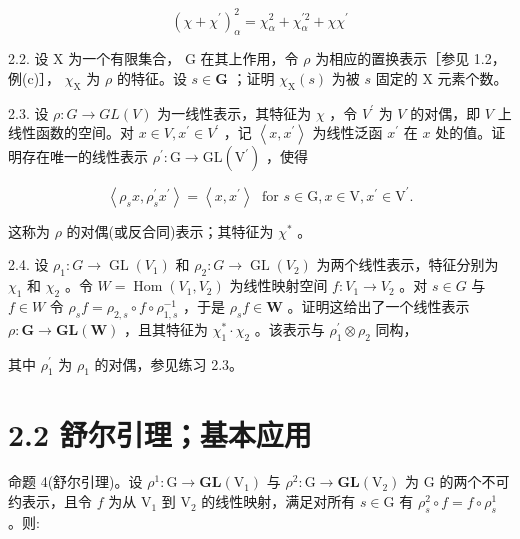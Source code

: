 \documentclass[10pt]{article}
\begin{document}
\[
{\left( \chi  + {\chi }^{\prime }\right) }_{\alpha }^{2} = {\chi }_{\alpha }^{2} + {\chi }_{\alpha }^{\prime 2} + \chi {\chi }^{\prime }
\]

2.2. 设 \(\mathrm{X}\) 为一个有限集合， \(\mathrm{G}\) 在其上作用，令 \(\rho\) 为相应的置换表示［参见 1.2，例(c)］， \({\chi }_{\mathrm{X}}\) 为 \(\rho\) 的特征。设 \(s \in  \mathbf{G}\) ；证明 \({\chi }_{\mathrm{X}}\left( s\right)\) 为被 \(s\) 固定的 \(\mathrm{X}\) 元素个数。

2.3. 设 \(\rho  : G \rightarrow  {GL}\left( V\right)\) 为一线性表示，其特征为 \(\chi\) ，令 \({V}^{\prime }\) 为 \(V\) 的对偶，即 \(V\) 上线性函数的空间。对 \(x \in  V,{x}^{\prime } \in  {V}^{\prime }\) ，记 \(\left\langle  {x,{x}^{\prime }}\right\rangle\) 为线性泛函 \({x}^{\prime }\) 在 \(x\) 处的值。证明存在唯一的线性表示 \({\rho }^{\prime } : \mathrm{G} \rightarrow  \mathrm{{GL}}\left( {\mathrm{V}}^{\prime }\right)\) ，使得

\[
\left\langle  {{\rho }_{s}x,{\rho }_{s}^{\prime }{x}^{\prime }}\right\rangle   = \left\langle  {x,{x}^{\prime }}\right\rangle  \;\text{ for }s \in  \mathrm{G},x \in  \mathrm{V},{x}^{\prime } \in  {\mathrm{V}}^{\prime }.
\]

这称为 \(\rho\) 的对偶(或反合同)表示；其特征为 \({\chi }^{ * }\) 。

2.4. 设 \({\rho }_{1} : G \rightarrow  \operatorname{GL}\left( {V}_{1}\right)\) 和 \({\rho }_{2} : G \rightarrow  \operatorname{GL}\left( {V}_{2}\right)\) 为两个线性表示，特征分别为 \({\chi }_{1}\) 和 \({\chi }_{2}\) 。令 \(W = \operatorname{Hom}\left( {{V}_{1},{V}_{2}}\right)\) 为线性映射空间 \(f : {V}_{1} \rightarrow  {V}_{2}\) 。对 \(s \in  G\) 与 \(f \in  W\) 令 \({\rho }_{s}f = {\rho }_{2,s} \circ  f \circ  {\rho }_{1,s}^{-1}\) ，于是 \({\rho }_{s}f \in  \mathbf{W}\) 。证明这给出了一个线性表示 \(\rho  : \mathbf{G} \rightarrow  \mathbf{{GL}}\left( \mathbf{W}\right)\) ，且其特征为 \({\chi }_{1}^{ * } \cdot  {\chi }_{2}\) 。该表示与 \({\rho }_{1}^{\prime } \otimes  {\rho }_{2}\) 同构，

其中 \({\rho }_{1}^{\prime }\) 为 \({\rho }_{1}\) 的对偶，参见练习 2.3。

\section*{2.2 舒尔引理；基本应用}

命题 4(舒尔引理)。设 \({\rho }^{1} : \mathrm{G} \rightarrow  \mathbf{{GL}}\left( {\mathrm{V}}_{1}\right)\) 与 \({\rho }^{2} : \mathrm{G} \rightarrow  \mathbf{{GL}}\left( {\mathrm{V}}_{2}\right)\) 为 \(\mathrm{G}\) 的两个不可约表示，且令 \(f\) 为从 \({\mathrm{V}}_{1}\) 到 \({\mathrm{V}}_{2}\) 的线性映射，满足对所有 \(s \in  \mathrm{G}\) 有 \({\rho }_{s}^{2} \circ  f = f \circ  {\rho }_{s}^{1}\) 。则:
\end{document}
